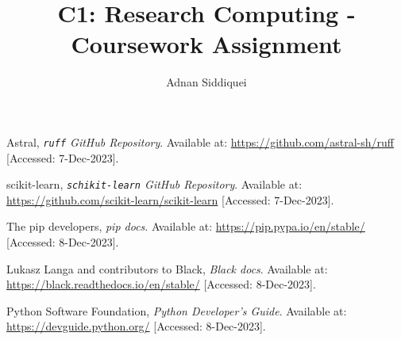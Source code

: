 \documentclass[a4paper,11pt]{article}
\title{\boldmath C1: Research Computing - Coursework Assignment}
\author{Adnan Siddiquei}
\affiliation{University of Cambridge}
\newcommand{\inlinecode}[1]{\lstinline{#1}}
\begin{document}
\maketitle
\flushbottom











\begin{thebibliography}{99}

Astral,
\textit{\inlinecode{ruff} GitHub Repository}.
Available at: \url{https://github.com/astral-sh/ruff}
[Accessed: 7-Dec-2023].

scikit-learn,
\textit{\inlinecode{schikit-learn} GitHub Repository}.
Available at: \url{https://github.com/scikit-learn/scikit-learn}
[Accessed: 7-Dec-2023].

The pip developers,
\textit{pip docs}.
Available at: \url{https://pip.pypa.io/en/stable/}
[Accessed: 8-Dec-2023].

Lukasz Langa and contributors to Black,
\textit{Black docs}.
Available at: \url{https://black.readthedocs.io/en/stable/}
[Accessed: 8-Dec-2023].

Python Software Foundation,
\textit{Python Developer's Guide}.
Available at: \url{https://devguide.python.org/}
[Accessed: 8-Dec-2023].

\end{thebibliography}
\end{document}
